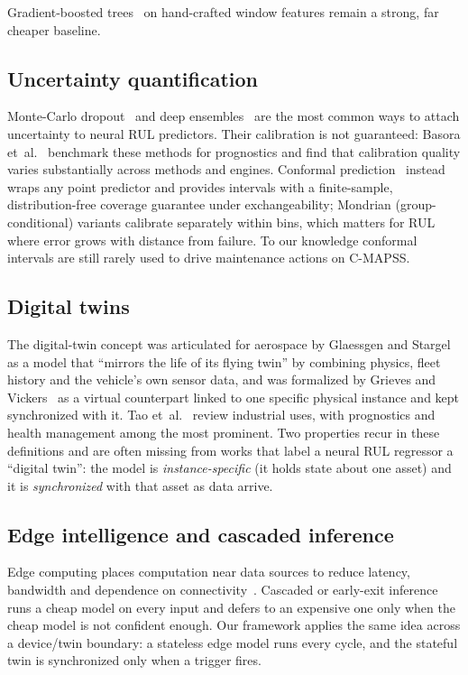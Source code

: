 Gradient-boosted trees~\cite{friedman2001gbm,ke2017lightgbm} on hand-crafted
window features remain a strong, far cheaper baseline.

\subsection{Uncertainty quantification}
Monte-Carlo dropout~\cite{gal2016dropout} and deep
ensembles~\cite{lakshminarayanan2017ensembles} are the most common ways to
attach uncertainty to neural RUL predictors. Their calibration is not
guaranteed: Basora et~al.~\cite{basora2023uqbench} benchmark these methods for
prognostics and find that calibration quality varies substantially across
methods and engines. Conformal
prediction~\cite{vovk2005alrw,angelopoulos2021gentle} instead wraps any point
predictor and provides intervals with a finite-sample, distribution-free
coverage guarantee under exchangeability; Mondrian (group-conditional) variants
calibrate separately within bins, which matters for RUL where error grows with
distance from failure. To our knowledge conformal intervals are still rarely
used to drive maintenance actions on C-MAPSS.

\subsection{Digital twins}
The digital-twin concept was articulated for aerospace by Glaessgen and
Stargel~\cite{glaessgen2012digital} as a model that ``mirrors the life of its
flying twin'' by combining physics, fleet history and the vehicle's own sensor
data, and was formalized by Grieves and Vickers~\cite{grieves2017digital} as a
virtual counterpart linked to one specific physical instance and kept
synchronized with it. Tao et~al.~\cite{tao2019digital} review industrial uses,
with prognostics and health management among the most prominent. Two
properties recur in these definitions and are often missing from works that
label a neural RUL regressor a ``digital twin'': the model is
\emph{instance-specific} (it holds state about one asset) and it is
\emph{synchronized} with that asset as data arrive.

\subsection{Edge intelligence and cascaded inference}
Edge computing places computation near data sources to reduce latency,
bandwidth and dependence on connectivity~\cite{shi2016edge}. Cascaded or
early-exit inference~\cite{teerapittayanon2016branchynet} runs a cheap model on
every input and defers to an expensive one only when the cheap model is not
confident enough. Our framework applies the same idea across a
device/twin boundary: a stateless edge model runs every cycle, and the
stateful twin is synchronized only when a trigger fires.

